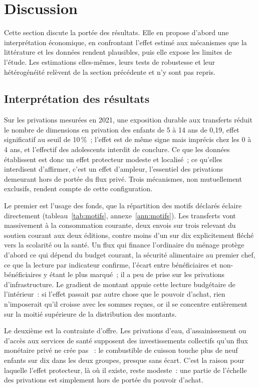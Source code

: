 \section{Discussion}
\label{sec:discussion}

Cette section discute la portée des résultats. Elle en propose d'abord une
interprétation économique, en confrontant l'effet estimé aux mécanismes que
la littérature et les données rendent plausibles, puis elle expose les
limites de l'étude. Les estimations elles-mêmes, leurs tests de robustesse
et leur hétérogénéité relèvent de la section précédente et n'y sont pas
repris.

\subsection{Interprétation des résultats}

Sur les privations mesurées en 2021, une exposition durable aux transferts
réduit le nombre de dimensions en privation des enfants de 5 à 14 ans de
0,19, effet significatif au seuil de 10\,\%~; l'effet est de même signe
mais imprécis chez les 0 à 4 ans, et l'effectif des adolescents interdit
de conclure. Ce que les données établissent est donc un effet protecteur
modeste et localisé~; ce qu'elles interdisent d'affirmer, c'est un effet d'ampleur,
l'essentiel des privations demeurant hors de portée du flux privé. Trois mécanismes, non mutuellement exclusifs, rendent compte de
cette configuration.

Le premier est l'usage des fonds, que la répartition des motifs déclarés
éclaire directement (tableau~\ref{tab:motifs}, annexe~\ref{ann:motifs}).
Les transferts vont massivement à la consommation courante, deux envois
sur trois relevant du soutien courant aux deux éditions, contre moins d'un
sur dix explicitement fléché vers la scolarité ou la santé. Un flux qui
finance l'ordinaire du ménage protège d'abord ce qui dépend du budget
courant, la sécurité alimentaire au premier chef, ce que la lecture par
indicateur confirme, l'écart entre bénéficiaires et non-bénéficiaires y
étant le plus marqué~; il a peu de prise sur les privations
d'infrastructure. Le gradient de montant appuie cette lecture budgétaire
de l'intérieur~: si l'effet passait par autre chose que le pouvoir d'achat,
rien n'imposerait qu'il croisse avec les sommes reçues, or il se concentre
entièrement sur la moitié supérieure de la distribution des montants.

Le deuxième est la contrainte d'offre. Les privations d'eau,
d'assainissement ou d'accès aux services de santé supposent des
investissements collectifs qu'un flux monétaire privé ne crée pas
\parencite{mansuri2006}~: le combustible de cuisson touche plus de neuf
enfants sur dix dans les deux groupes, presque sans écart. C'est la
raison pour laquelle l'effet protecteur, là où il existe, reste modeste~:
une partie de l'échelle des privations est simplement hors de portée du
pouvoir d'achat.

